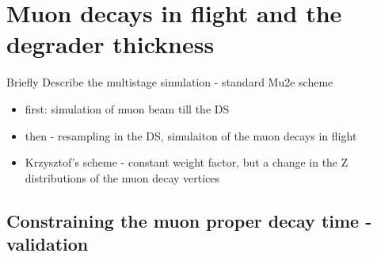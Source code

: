 \section {Muon decays in flight and the degrader thickness}

{\red Briefly Describe the multistage simulation - standard Mu2e scheme
  \begin{itemize}
  \item
    first: simulation of muon beam till the DS
  \item
    then - resampling in the DS, simulaiton of the muon decays in flight
  \item
    Krzysztof's scheme - constant weight factor, but a change in the Z distributions
    of the muon decay vertices
  \end{itemize}
}


\subsection {Constraining the muon proper decay time - validation}



